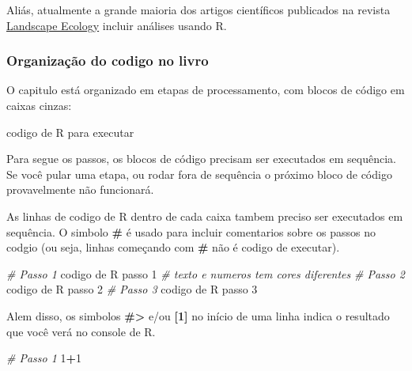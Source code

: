 \documentclass[
]{article}
\newenvironment{Shaded}{\begin{snugshade}}{\end{snugshade}}
\newcommand{\CommentTok}[1]{\textcolor[rgb]{0.56,0.35,0.01}{\textit{#1}}}
\newcommand{\DecValTok}[1]{\textcolor[rgb]{0.00,0.00,0.81}{#1}}
\newcommand{\NormalTok}[1]{#1}
\newcommand{\SpecialCharTok}[1]{\textcolor[rgb]{0.81,0.36,0.00}{\textbf{#1}}}
\begin{document}
Aliás, atualmente a grande maioria dos artigos científicos publicados na revista \href{https://www.springer.com/journal/10980/}{Landscape Ecology} incluir análises usando R.

\newpage

\hypertarget{organizauxe7uxe3o-do-codigo-no-livro}{%
\subsubsection*{Organização do codigo no livro}\label{organizauxe7uxe3o-do-codigo-no-livro}}

O capitulo está organizado em etapas de processamento, com blocos de código em caixas cinzas:

\begin{Shaded}
\begin{Highlighting}[]
\NormalTok{codigo de R para executar}
\end{Highlighting}
\end{Shaded}

Para segue os passos, os blocos de código precisam ser executados em sequência. Se você pular uma etapa, ou rodar fora de sequência o próximo bloco de código provavelmente não funcionará.

As linhas de codigo de R dentro de cada caixa tambem preciso ser executados em sequência. O simbolo \textbf{\#} é usado para incluir comentarios sobre os passos no codgio (ou seja, linhas começando com \textbf{\#} não é codigo de executar).

\begin{Shaded}
\begin{Highlighting}[]
\CommentTok{\# Passo 1}
\NormalTok{codigo de R passo }\DecValTok{1} \CommentTok{\# texto e numeros tem cores diferentes}
\CommentTok{\# Passo 2}
\NormalTok{codigo de R passo }\DecValTok{2}
\CommentTok{\# Passo 3}
\NormalTok{codigo de R passo }\DecValTok{3}
\end{Highlighting}
\end{Shaded}

Alem disso, os simbolos \textbf{\#>} e/ou \textbf{[1]} no início de uma linha indica o resultado que você verá no console de R.

\begin{Shaded}
\begin{Highlighting}[]
\CommentTok{\# Passo 1}
\DecValTok{1}\SpecialCharTok{+}\DecValTok{1}
\end{Highlighting}
\end{Shaded}
\end{document}
